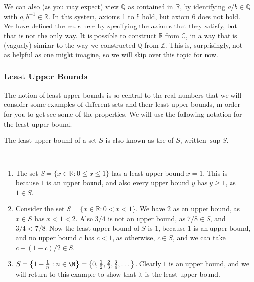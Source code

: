 \documentclass[a4paper]{scrartcl}
\begin{document}
We can also (as you may expect) view $\mathbb{Q}$ as contained in $\mathbb{R}$, by identifying $a/b \in \mathbb{Q}$ with $a, b^{-1} \in \mathbb{R}$. In this system, axioms 1 to 5 hold, but axiom 6 does not hold.
We have defined the reals here by specifying the axioms that they satisfy, but that is not the only way. It is possible to construct $\mathbb{R}$ from $\mathbb{Q}$, in a way that is (vaguely) similar to the way we constructed $\mathbb{Q}$ from $\mathbb{Z}$. This is, surprisingly, not as helpful as one might imagine, so we will skip over this topic for now.

\subsubsection{Least Upper Bounds}

The notion of least upper bounds is so central to the real numbers that we will consider some examples of different sets and their least upper bounds, in order for you to get see some of the properties. We will use the following notation for the least upper bound.

\begin{definition}[Supremum]
	The least upper bound of a set $S$ is also known as the  of $S$, written $\sup S$.
\end{definition}

\begin{example}~
    \vspace*{-\baselineskip}
\begin{enumerate}
	\item The set $S = \{x \in \mathbb{R} : 0 \leq x \leq 1\}$ has a least upper bound $x = 1$. This is because $1$ is an upper bound, and also every upper bound $y$ has $y \geq 1$, as $1 \in S$.
	\item Consider the set $S = \{ x \in \mathbb{R} : 0 < x < 1\}$. We have $2$ as an upper bound, as $x \in S$ has $x < 1 < 2$. Also $3/4$ is not an upper bound, as $7/8 \in S$, and $3/4 < 7/8$. Now the least upper bound of $S$ is $1$, because $1$ is an upper bound, and no upper bound $c$ has $c < 1$, as otherwise, $c \in S$, and we can take $c + (1 - c)/2 \in S$.
	\item $S = \left\{1 - \frac{1}{n}  : n \in \N \right\} = \left\{0, \frac{1}{2}, \frac{2}{3}, \frac{3}{4}, \dots \right\}$. Clearly $1$ is an upper bound, and we will return to this example to show that it is the least upper bound.
\end{enumerate}
\end{example}
\end{document}
